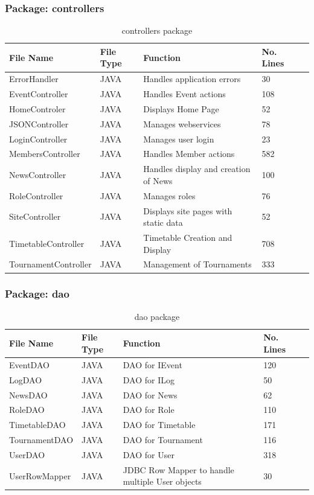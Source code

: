 \subsubsection{Package: controllers}
\begin{table}[H]
\begin{center}
   \begin{tabular}{| l | l | l| l |p{1cm} |}
    \hline
    File Name & File Type & Function & No. Lines\\ \hline
    ErrorHandler & JAVA & Handles application errors & 30 \\ \hline
	EventController & JAVA & Handles Event actions & 108\\ \hline
	HomeControler & JAVA & Displays Home Page & 52\\ \hline
	JSONController & JAVA & Manages webservices & 78\\ \hline
	LoginController & JAVA & Manages user login & 23\\ \hline
	MembersController & JAVA & Handles Member actions &  582\\ \hline
	NewsController & JAVA & Handles display and creation of News  & 100\\ \hline
	RoleController & JAVA & Manages roles & 76 \\ \hline
	SiteController & JAVA & Displays site pages with static data & 52\\ \hline
	TimetableController & JAVA & Timetable Creation and Display & 708 \\ \hline
	TournamentController & JAVA & Management of Tournaments & 333 \\ \hline
    \end{tabular}
\end{center}
\caption{controllers package}
\end{table}

\subsubsection{Package: dao}
\begin{table}[H]
\begin{center}
    \begin{tabular}{| l | l | l| l |p{1cm} |}
    \hline
    File Name & File Type & Function & No. Lines\\ \hline
    EventDAO & JAVA & DAO for IEvent & 120 \\ \hline
	LogDAO & JAVA & DAO for ILog & 50\\ \hline
	NewsDAO & JAVA & DAO for News & 62\\ \hline
	RoleDAO & JAVA & DAO for Role & 110 \\ \hline
	TimetableDAO & JAVA & DAO for Timetable & 171\\ \hline
	TournamentDAO & JAVA & DAO for Tournament & 116\\ \hline
	UserDAO & JAVA & DAO for User & 318 \\ \hline
	UserRowMapper & JAVA & JDBC Row Mapper to handle multiple User objects & 30\\ \hline	
    \end{tabular}
\end{center}
\caption{dao package}
\end{table}

